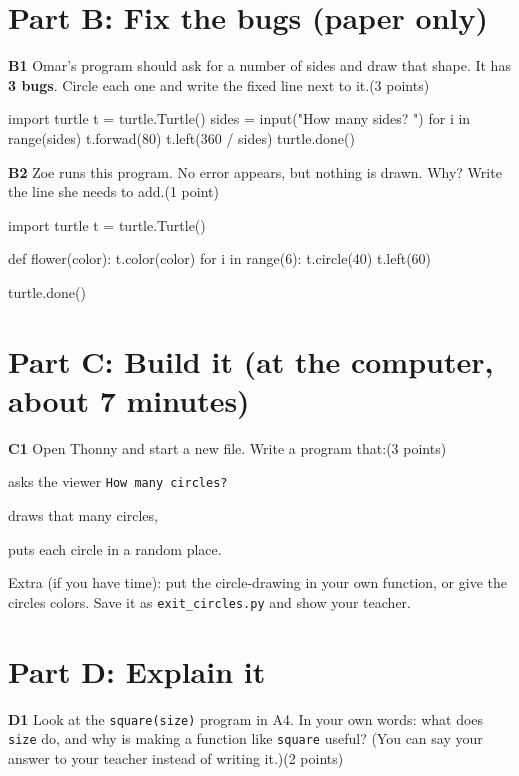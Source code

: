 \documentclass[level=1]{kidscode}
\newcommand{\qnum}[1]{\textbf{\color{kcaccent}#1}\quad}
\newcommand{\pts}[1]{\hfill{\small(#1)}}
\begin{document}
\section{Part B: Fix the bugs (paper only)}
\qnum{B1} Omar's program should ask for a number of sides and draw that shape.
It has \textbf{3 bugs}. Circle each one and write the fixed line next to it.\pts{3 points}
\begin{pycode}
import turtle
t = turtle.Turtle()
sides = input("How many sides? ")
for i in range(sides)
    t.forwad(80)
    t.left(360 / sides)
turtle.done()
\end{pycode}

\qnum{B2} Zoe runs this program. No error appears, but nothing is drawn. Why? Write the line she needs to add.\pts{1 point}
\begin{pycode}
import turtle
t = turtle.Turtle()

def flower(color):
    t.color(color)
    for i in range(6):
        t.circle(40)
        t.left(60)

turtle.done()
\end{pycode}

\section{Part C: Build it (at the computer, about 7 minutes)}
\qnum{C1} Open Thonny and start a new file. Write a program that:\pts{3 points}
\begin{checklist}
  \item asks the viewer \texttt{How many circles?}
  \item draws that many circles,
  \item puts each circle in a random place.
\end{checklist}
Extra (if you have time): put the circle-drawing in your own function, or give the circles colors.
Save it as \texttt{exit\_circles.py} and show your teacher.

\section{Part D: Explain it}
\qnum{D1} Look at the \texttt{square(size)} program in A4. In your own words: what does \texttt{size} do,
and why is making a function like \texttt{square} useful? (You can say your answer to your teacher instead of writing it.)\pts{2 points}
\end{document}
